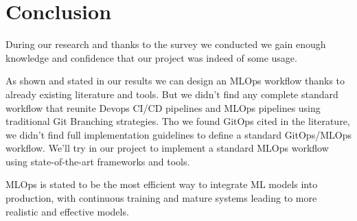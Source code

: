 \section{Conclusion}\label{sec:stconclusion}

During our research and thanks to the survey we conducted we gain enough knowledge and confidence that our project was indeed of some usage.

As shown and stated in our results we can design an MLOps workflow thanks to already existing literature and tools.
But we didn't find any complete standard workflow that reunite Devops CI/CD pipelines and MLOps pipelines using traditional Git Branching strategies.
Tho we found GitOps cited in the literature, we didn't find full implementation guidelines to define a standard GitOps/MLOps workflow.
We'll try in our project to implement a standard MLOps workflow using state-of-the-art frameworks and tools.

MLOps is stated to be the most efficient way to integrate ML models into production, with continuous training and mature systems leading to more realistic and effective models.\cite{inproceedings}
